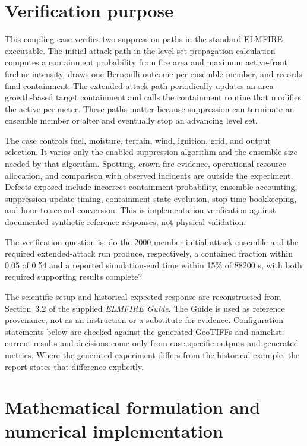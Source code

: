 \section{Verification purpose}

This coupling case verifies two suppression paths in the standard ELMFIRE executable. The initial-attack path in the level-set propagation calculation computes a containment probability from fire area and maximum active-front fireline intensity, draws one Bernoulli outcome per ensemble member, and records final containment. The extended-attack path periodically updates an area-growth-based target containment and calls the containment routine that modifies the active perimeter. These paths matter because suppression can terminate an ensemble member or alter and eventually stop an advancing level set.

The case controls fuel, moisture, terrain, wind, ignition, grid, and output selection. It varies only the enabled suppression algorithm and the ensemble size needed by that algorithm. Spotting, crown-fire evidence, operational resource allocation, and comparison with observed incidents are outside the experiment. Defects exposed include incorrect containment probability, ensemble accounting, suppression-update timing, containment-state evolution, stop-time bookkeeping, and hour-to-second conversion. This is implementation verification against documented synthetic reference responses, not physical validation.

The verification question is: do the 2000-member initial-attack ensemble and the required extended-attack run produce, respectively, a contained fraction within 0.05 of 0.54 and a reported simulation-end time within 15\% of 88200 s, with both required supporting results complete?

The scientific setup and historical expected response are reconstructed from Section~3.2 of the supplied \emph{ELMFIRE Guide}. The Guide is used as reference provenance, not as an instruction or a substitute for evidence. Configuration statements below are checked against the generated GeoTIFFs and namelist; current results and decisions come only from case-specific outputs and generated metrics. Where the generated experiment differs from the historical example, the report states that difference explicitly.

\section{Mathematical formulation and numerical implementation}

